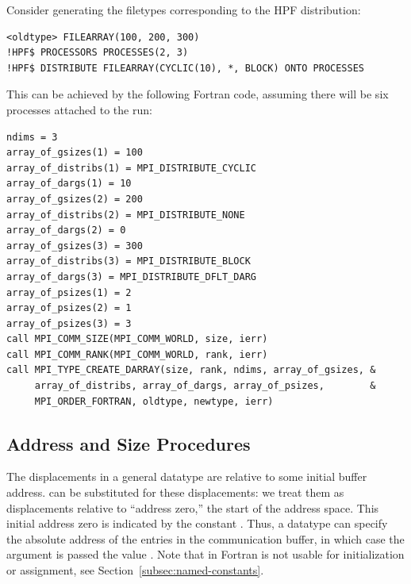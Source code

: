 \begin{example}
Consider generating the filetypes corresponding to the HPF distribution:
\label{ex:io-hpf}
%
%
\begin{lstlisting}[language={[HPF]Fortran}]
      <oldtype> FILEARRAY(100, 200, 300)
!HPF$ PROCESSORS PROCESSES(2, 3)
!HPF$ DISTRIBUTE FILEARRAY(CYCLIC(10), *, BLOCK) ONTO PROCESSES
\end{lstlisting}
This can be achieved by the following Fortran code,
assuming there will be six processes attached to the run:
\begin{lstlisting}[language={[MPI]Fortran}]
ndims = 3
array_of_gsizes(1) = 100
array_of_distribs(1) = MPI_DISTRIBUTE_CYCLIC
array_of_dargs(1) = 10
array_of_gsizes(2) = 200
array_of_distribs(2) = MPI_DISTRIBUTE_NONE
array_of_dargs(2) = 0
array_of_gsizes(3) = 300
array_of_distribs(3) = MPI_DISTRIBUTE_BLOCK
array_of_dargs(3) = MPI_DISTRIBUTE_DFLT_DARG
array_of_psizes(1) = 2
array_of_psizes(2) = 1
array_of_psizes(3) = 3
call MPI_COMM_SIZE(MPI_COMM_WORLD, size, ierr)
call MPI_COMM_RANK(MPI_COMM_WORLD, rank, ierr)
call MPI_TYPE_CREATE_DARRAY(size, rank, ndims, array_of_gsizes, &
     array_of_distribs, array_of_dargs, array_of_psizes,        &
     MPI_ORDER_FORTRAN, oldtype, newtype, ierr)
\end{lstlisting}
\end{example}


\subsection{Address and Size Procedures}
\label{subsec:pt2pt-addfunc}

The displacements in a general datatype are relative to some initial buffer
address.
can be substituted for these
displacements: we treat them as displacements relative to ``address
zero,'' the start of the address space.  This initial address zero is
indicated by the constant .  Thus, a datatype can
specify the absolute address of the entries in the communication
buffer, in which case the  argument is passed the value
.
Note that in Fortran  is not usable for initialization or
assignment, see Section~\ref{subsec:named-constants}.

